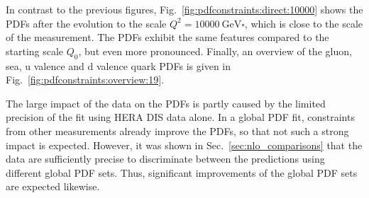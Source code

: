 In contrast to the previous figures, Fig.~\ref{fig:pdfconstraints:direct:10000}
shows the PDFs after the evolution to the scale $Q^2 = \SI{10000}{\GeV
\square}$, which is close to the scale of the measurement. The PDFs exhibit the same
features compared to the starting scale $Q_0$, but even more pronounced.
Finally, an overview of the gluon, sea, u valence and d valence quark PDFs is
given in Fig.~\ref{fig:pdfconstraints:overview:19}. 

The large impact of the data on the PDFs is partly caused by the limited
precision of the fit using HERA DIS data alone. In a global PDF fit, constraints
from other measurements already improve the PDFs, so that not such a strong
impact is expected. However, it was shown in Sec.~\ref{sec:nlo_comparisons} that
the data are sufficiently precise to discriminate between the predictions using
different global PDF sets. Thus, significant improvements of the global
PDF sets are expected likewise.

